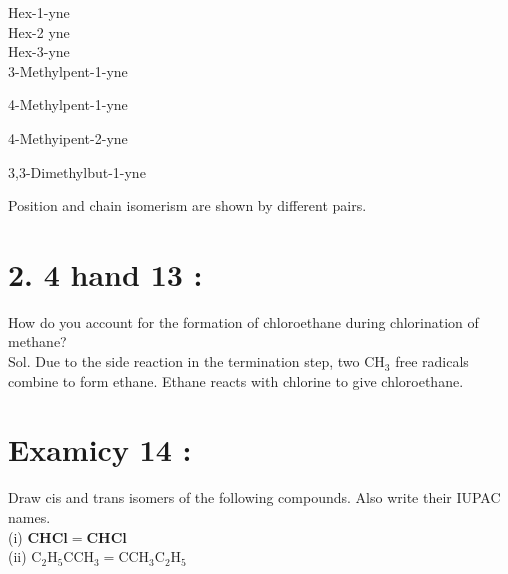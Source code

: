 \documentclass[10pt]{article}
\begin{document}
Hex-1-yne\\
Hex-2 yne\\
Hex-3-yne\\
3-Methylpent-1-yne

4-Methylpent-1-yne

4-Methyipent-2-yne

3,3-Dimethylbut-1-yne

Position and chain isomerism are shown by different pairs.

\section*{2. 4 hand 13 :}
How do you account for the formation of chloroethane during chlorination of methane?\\
Sol. Due to the side reaction in the termination step, two $\mathrm{CH}_{3}$ free radicals combine to form ethane. Ethane reacts with chlorine to give chloroethane.

\section*{Examicy 14 :}
Draw cis and trans isomers of the following compounds. Also write their IUPAC names.\\
(i) $\mathbf{C H C l}=\mathbf{C H C l}$\\
(ii) $\mathrm{C}_{2} \mathrm{H}_{5} \mathrm{CCH}_{3}=\mathrm{CCH}_{3} \mathrm{C}_{2} \mathrm{H}_{5}$
\end{document}
